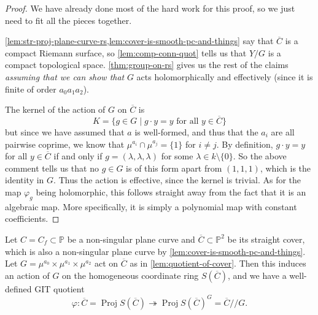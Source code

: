 \documentclass[10pt,notitlepage]{article}
\numberwithin{equation}{subsection}
\DeclareMathOperator{\proj}{Proj}
\newcommand{\pee}{\mathbb{P}}
\newcommand{\noz}{\setminus\{0\}}
\newcommand{\cover}[1]{\overline{#1}}
\newcommand{\sslash}{/\!\!/}
\begin{document}
        \begin{proof}
            We have already done most of the hard work for this proof, so we just need to fit all the pieces together.

            \cref{lem:str-proj-plane-curve-rs,lem:cover-is-smooth-pc-and-things} say that $\cover{C}$ is a compact Riemann surface, so \cref{lem:comp-conn-quot} tells us that $Y/G$ is a compact topological space.
            \cref{thm:group-on-rs} gives us the rest of the claims \emph{assuming that we can show that} $G$ acts holomorphically and effectively (since it is finite of order $a_0a_1a_2$).

            The kernel of the action of $G$ on $\cover{C}$ is
            \[
                K = \{g\in G\mid g\cdot y = y\text{ for all }y\in \cover{C}\}
            \]
            but since we have assumed that $a$ is well-formed, and thus that the $a_i$ are all pairwise coprime, we know that $\mu^{a_i}\cap\mu^{a_j}=\{1\}$ for $i\neq j$.
            By definition, $g\cdot y=y$ for all $y\in\cover{C}$ if and only if $g=(\lambda,\lambda,\lambda)$ for some $\lambda\in k\noz$.
            So the above comment tells us that no $g\in G$ is of this form apart from $(1,1,1)$, which is the identity in $G$.
            Thus the action is effective, since the kernel is trivial.
            As for the map $\varphi_g$ being holomorphic, this follows straight away from the fact that it is an algebraic map.
            More specifically, it is simply a polynomial map with constant coefficients.
        \end{proof}

        \begin{lemma}\label{lem:git-quotient-exists}
            Let $C=C_f\subset\pee$ be a non-singular plane curve and $\cover{C}\subset\pee^2$ be its straight cover, which is also a non-singular plane curve by \cref{lem:cover-is-smooth-pc-and-things}.
            Let $G=\mu^{a_0}\times\mu^{a_1}\times\mu^{a_2}$ act on $\cover{C}$ as in \cref{lem:quotient-of-cover}.
            Then this induces an action of $G$ on the homogeneous coordinate ring $S(\cover{C})$, and we have a well-defined GIT quotient
            \[
                \varphi\colon\cover{C}=\proj S(\cover{C})\twoheadrightarrow\proj S(\cover{C})^G=\cover{C}\sslash G.
            \]
        \end{lemma}
\end{document}
